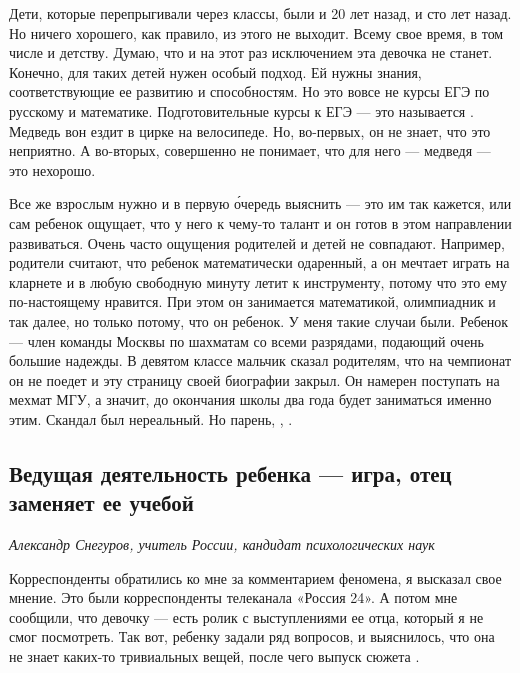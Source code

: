 Дети, которые перепрыгивали через классы, были и 20 лет назад, и сто лет назад. Но ничего хорошего, как правило, из этого не выходит. Всему свое время, в том числе и детству. Думаю, что и на этот раз исключением эта девочка не станет. Конечно, для таких детей нужен особый подход. Ей нужны знания, соответствующие ее развитию и способностям. Но это вовсе не курсы ЕГЭ по русскому и математике. Подготовительные курсы к ЕГЭ --- это называется . Медведь вон ездит в цирке на велосипеде. Но, во-первых, он не знает, что это неприятно. А во-вторых, совершенно не понимает, что для него --- медведя --- это нехорошо.

Все же взрослым нужно   и в первую \'{о}чередь выяснить --- это им так кажется, или сам ребенок ощущает, что у него к чему-то талант и он готов в этом направлении развиваться. Очень часто ощущения родителей и детей не совпадают. Например, родители считают, что ребенок математически одаренный, а он мечтает играть на кларнете и в любую свободную минуту летит к инструменту, потому что это ему по-настоящему нравится. При этом он занимается математикой, олимпиадник и так далее, но только потому, что он  ребенок. У меня такие случаи были. Ребенок --- член команды Москвы по шахматам со всеми разрядами, подающий очень большие надежды. В девятом классе мальчик сказал родителям, что на  чемпионат он не поедет и эту страницу своей биографии закрыл. Он намерен поступать на мехмат МГУ, а значит,  до окончания школы два года будет заниматься именно этим. Скандал был нереальный. Но парень, , .


\subsection{Ведущая деятельность ребенка --- игра, отец заменяет ее учебой}
\textit{Александр Снегуров,  учитель России, кандидат психологических наук}

Корреспонденты обратились ко мне за комментарием феномена, я высказал свое мнение. Это были корреспонденты телеканала «Россия 24». А потом мне сообщили, что девочку  --- есть ролик с выступлениями ее отца, который я не смог посмотреть. Так вот, ребенку задали ряд вопросов, и выяснилось, что она не знает каких-то тривиальных вещей, после чего выпуск сюжета .

